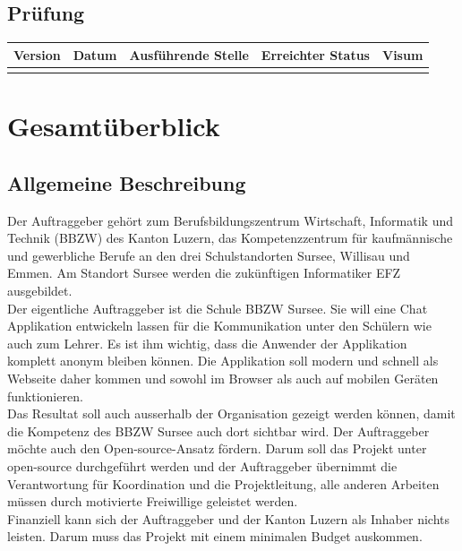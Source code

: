 \documentclass[12pt]{article}
\begin{document}
  \subsection{Prüfung}
    \begin{table}[h]
      \begin{tabularx}{\textwidth}{|l|l|l|X|l|}
        \hline
        \textbf{Version} & \textbf{Datum} & \textbf{Ausführende Stelle}   & \textbf{Erreichter Status}  & \textbf{Visum}  \\ \hline
                         &                &                               &                             &                 \\ \hline
      \end{tabularx}
    \end{table}

  \newpage
  \tableofcontents
  \newpage



  \section{Gesamtüberblick}
    \subsection{Allgemeine Beschreibung}
        Der Auftraggeber gehört zum Berufsbildungszentrum Wirtschaft, Informatik und Technik (BBZW) des Kanton Luzern, das Kompetenzzentrum für kaufmännische und gewerbliche Berufe an den drei Schulstandorten Sursee, Willisau und Emmen. Am Standort Sursee werden die zukünftigen Informatiker EFZ ausgebildet. \\
        Der eigentliche Auftraggeber ist  die Schule BBZW Sursee. Sie will eine Chat Applikation entwickeln lassen für die Kommunikation unter den Schülern wie auch zum Lehrer. Es ist ihm wichtig, dass die Anwender der Applikation komplett anonym bleiben können. Die Applikation soll modern und schnell als Webseite daher kommen und sowohl im Browser als auch auf mobilen Geräten funktionieren. \\
        Das Resultat soll auch ausserhalb der Organisation gezeigt werden können, damit die Kompetenz des BBZW Sursee auch dort sichtbar wird.
        Der Auftraggeber möchte auch den Open-source-Ansatz fördern. Darum soll das Projekt unter open-source durchgeführt werden und der Auftraggeber übernimmt die Verantwortung für Koordination und die Projektleitung, alle anderen Arbeiten müssen durch motivierte Freiwillige geleistet werden. \\
        Finanziell kann sich der Auftraggeber und der Kanton Luzern als Inhaber nichts leisten. Darum muss das Projekt mit einem minimalen Budget auskommen.
\end{document}
